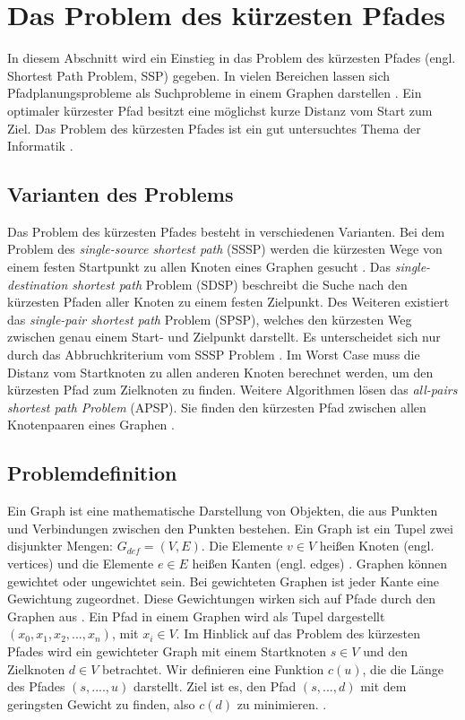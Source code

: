 \chapter{Das Problem des kürzesten Pfades}

In diesem Abschnitt wird ein Einstieg in das Problem des kürzesten Pfades (engl. Shortest Path Problem, SSP) gegeben. In vielen Bereichen lassen sich Pfadplanungsprobleme als Suchprobleme in einem Graphen darstellen \cite{HartNilssonandRaphael.1968}. Ein optimaler kürzester Pfad besitzt eine möglichst kurze Distanz vom Start zum Ziel. Das Problem des kürzesten Pfades ist ein gut untersuchtes Thema der Informatik \cite[S.1]{Madkour.2017}.


\section{Varianten des Problems}

Das Problem des kürzesten Pfades besteht in verschiedenen Varianten. Bei dem Problem des \textit{single-source shortest path} (SSSP) werden die kürzesten Wege von einem festen Startpunkt zu allen Knoten eines Graphen gesucht \cite[S.644]{Cormen.2009}. Das \textit{single-destination shortest path} Problem (SDSP)  beschreibt die Suche nach den kürzesten Pfaden aller Knoten zu einem festen Zielpunkt. Des Weiteren existiert das \textit{single-pair shortest path} Problem (SPSP), welches den kürzesten Weg zwischen genau einem Start- und Zielpunkt darstellt. Es unterscheidet sich nur durch das Abbruchkriterium vom SSSP Problem \cite{Ottmann.2017}. Im Worst Case muss die Distanz vom Startknoten zu allen anderen Knoten berechnet werden, um den kürzesten Pfad zum Zielknoten zu finden. Weitere Algorithmen lösen das \textit{all-pairs shortest path Problem} (APSP). Sie finden den kürzesten Pfad zwischen allen Knotenpaaren eines Graphen \cite[S.644]{Cormen.2009}.


\section{Problemdefinition}

Ein Graph ist eine mathematische Darstellung von Objekten, die aus Punkten und Verbindungen zwischen den Punkten bestehen. 
Ein Graph ist ein Tupel zwei disjunkter Mengen: $G_{def}= (V,E)$. Die Elemente $v \in V$ heißen Knoten (engl. vertices) und die Elemente $e \in E$ heißen Kanten (engl. edges) \cite[S.15]{Gross.2004}. 
Graphen können gewichtet oder ungewichtet sein. Bei gewichteten Graphen ist jeder Kante eine Gewichtung zugeordnet. 
Diese Gewichtungen wirken sich auf Pfade durch den Graphen aus \cite[S.18]{Gross.2004}. 
Ein Pfad in einem Graphen wird als Tupel dargestellt $\left ( x_{0}, x_{1}, x_{2}, ..., x_{n} \right )$, mit $x_{i} \in V$. 
Im Hinblick auf das Problem des kürzesten Pfades wird ein gewichteter Graph mit einem Startknoten $s \in V$ und den Zielknoten $d \in V$ betrachtet. Wir definieren eine Funktion $c(u)$, die die Länge des Pfades $ (s, ...., u)$ darstellt. Ziel ist es, den Pfad  $\left ( s, ..., d \right )$ mit dem geringsten Gewicht zu finden, also $c(d)$ zu minimieren. \cite[S.4]{Madkour.2017}.


